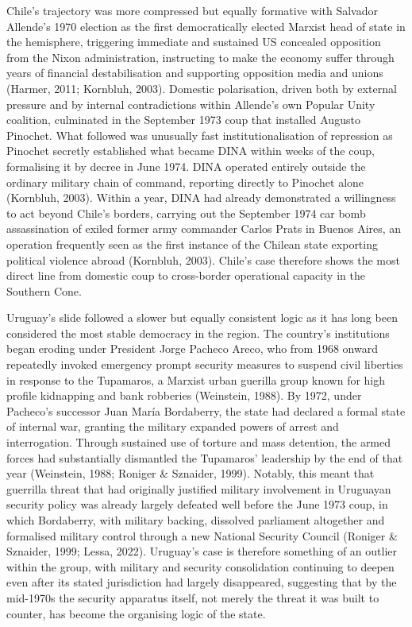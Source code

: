 
Chile’s trajectory was more compressed but equally formative with Salvador Allende’s 1970 election as the first democratically elected Marxist head of state in the hemisphere, triggering immediate and sustained US concealed opposition from the Nixon administration, instructing to make the economy suffer through years of financial destabilisation and supporting opposition media and unions (Harmer, 2011; Kornbluh, 2003). Domestic polarisation, driven both by external pressure and by internal contradictions within Allende’s own Popular Unity coalition, culminated in the September 1973 coup that installed Augusto Pinochet. What followed was unusually fast institutionalisation of repression as Pinochet secretly established what became DINA within weeks of the coup, formalising it by decree in June 1974. DINA operated entirely outside the ordinary military chain of command, reporting directly to Pinochet alone (Kornbluh, 2003). Within a year, DINA had already demonstrated a willingness to act beyond Chile’s borders, carrying out the September 1974 car bomb assassination of exiled former army commander Carlos Prats in Buenos Aires, an operation frequently seen as the first instance of the Chilean state exporting political violence abroad (Kornbluh, 2003). Chile's case therefore shows the most direct line from domestic coup to cross-border operational capacity in the Southern Cone.


Uruguay’s slide followed a slower but equally consistent logic as it has long been considered the most stable democracy in the region. The country’s institutions began eroding under President Jorge Pacheco Areco, who from 1968 onward repeatedly invoked emergency prompt security measures to suspend civil liberties in response to the Tupamaros, a Marxist urban guerilla group known for high profile kidnapping and bank robberies (Weinstein, 1988). By 1972, under Pacheco’s successor Juan María Bordaberry, the state had declared a formal state of internal war, granting the military expanded powers of arrest and interrogation. Through sustained use of torture and mass detention, the armed forces had substantially dismantled the Tupamaros’ leadership by the end of that year (Weinstein, 1988; Roniger \& Sznaider, 1999). Notably, this meant that guerrilla threat that had originally justified military involvement in Uruguayan security policy was already largely defeated well before the June 1973 coup, in which Bordaberry, with military backing, dissolved parliament altogether and formalised military control through a new National Security Council (Roniger \& Sznaider, 1999; Lessa, 2022). Uruguay’s case is therefore something of an outlier within the group, with military and security consolidation continuing to deepen even after its stated jurisdiction had largely disappeared, suggesting that by the mid-1970s the security apparatus itself, not merely the threat it was built to counter, has become the organising logic of the state.

